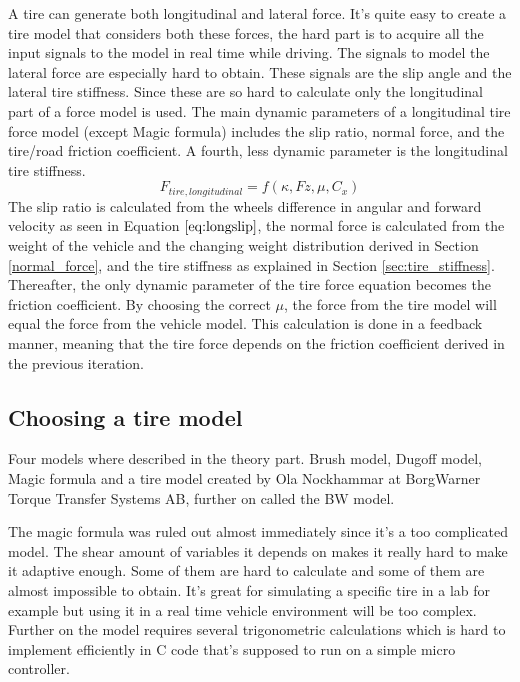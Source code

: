 A tire can generate both longitudinal and lateral force. It's quite easy to create a tire model that considers both these forces, the hard part is to acquire all the input signals to the model in real time while driving. The signals to model the lateral force are especially hard to obtain. These signals are the slip angle and the lateral tire stiffness. Since these are so hard to calculate only the longitudinal part of a force model is used. The main dynamic parameters of a longitudinal tire force model (except Magic formula) includes the slip ratio, normal force, and the tire/road friction coefficient. A fourth, less dynamic parameter is the longitudinal tire stiffness. 
\begin{equation}
F_{tire, longitudinal} = f(\kappa, Fz, \mu, C_{x})
\end{equation}
The slip ratio is calculated from the wheels difference in angular and forward velocity as seen in Equation $ \ref{eq:longslip} $, the normal force is calculated from the weight of the vehicle and the changing weight distribution derived in  Section \ref{normal_force}, and the tire stiffness as explained in Section \ref{sec:tire_stiffness}. Thereafter, the only dynamic parameter of the tire force equation becomes the friction coefficient. By choosing the correct $ \mu $, the force from the tire model will equal the force from the vehicle model. This calculation is done in a feedback manner, meaning that the tire force depends on the friction coefficient derived in the previous iteration.

\subsection{Choosing a tire model}
Four models where described in the theory part. Brush model, Dugoff model, Magic formula and a tire model created by Ola Nockhammar at BorgWarner Torque Transfer Systems AB, further on called the BW model.

The magic formula was ruled out almost immediately since it's a too complicated model. The shear amount of variables it depends on makes it really hard to make it adaptive enough. Some of them are hard to calculate and some of them are almost impossible to obtain. It's great for simulating a specific tire in a lab for example but using it in a real time vehicle environment will be too complex. Further on the model requires several trigonometric calculations which is hard to implement efficiently in C code that's supposed to run on a simple micro controller. 

